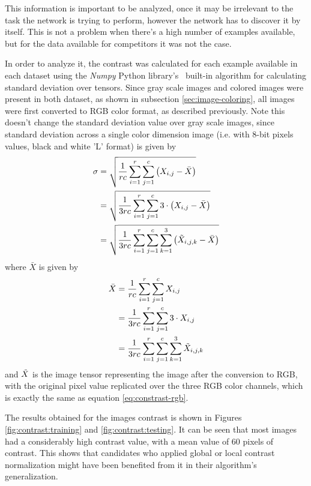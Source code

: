 \documentclass[12pt,
    brazil,			%
	english,        %
	]{article}
\begin{document}
This information is important to be analyzed, once it may be irrelevant to the task the network is trying to perform, however the network has to discover it by itself. This is not a problem when there's a high number of examples available, but for the data available for competitors it was not the case.

In order to analyze it, the contrast was calculated for each example available in each dataset using the \textit{Numpy} Python library's~\cite{numpy2019docs} built-in algorithm for calculating standard deviation over tensors. Since gray scale images and colored images were present in both dataset, as shown in subsection \ref{sec:image-coloring}, all images were first converted to RGB color format, as described previously. Note this doesn't change the standard deviation value over gray scale images, since standard deviation across a single color dimension image (i.e. with 8-bit pixels values, black and white 'L' format) is given by
\begin{alignat}{2}
    \sigma  &= \sqrt{\frac{1}{rc} \sum_{i=1}^{r} \sum_{j=1}^{c} \left(X_{i,j} - \bar{X}\right)} \\
            &= \sqrt{\frac{1}{3rc} \sum_{i=1}^{r} \sum_{j=1}^{c} 3 \cdot \left(X_{i,j} - \bar{X}\right)} \\
            &= \sqrt{\frac{1}{3rc}\sum_{i=1}^{r} \sum_{j=1}^{c} \sum_{k=1}^{3} \left(\Tilde{X}_{i,j,k} - \bar{X}\right)}
\end{alignat}
where $\bar{X}$ is given by
\begin{alignat}{2}
    \bar{X} &= \frac{1}{rc} \sum_{i=1}^{r} \sum_{j=1}^{c} X_{i,j} \\
            &= \frac{1}{3rc} \sum_{i=1}^{r} \sum_{j=1}^{c} 3 \cdot X_{i,j} \\
            &= \frac{1}{3rc} \sum_{i=1}^{r} \sum_{j=1}^{c} \sum_{k=1}^{3} \Tilde{X}_{i,j,k}
\end{alignat}
and $\Tilde{X}$ is the image tensor representing the image after the conversion to RGB, with the original pixel value replicated over the three RGB color channels, which is exactly the same as equation \ref{eq:constrast-rgb}.

The results obtained for the images contrast is shown in Figures \ref{fig:contrast:training} and \ref{fig:contrast:testing}. It can be seen that most images had a considerably high contrast value, with a mean value of 60 pixels of contrast. This shows that candidates who applied global or local contrast normalization might have been benefited from it in their algorithm's generalization.
\end{document}
